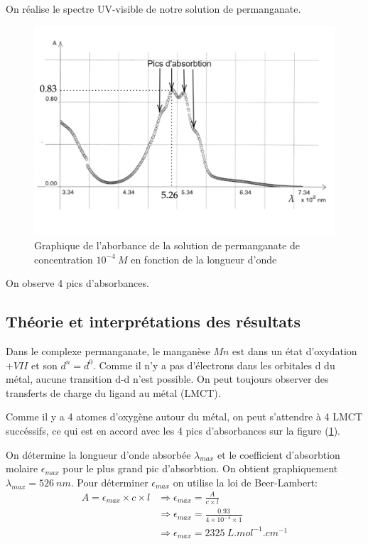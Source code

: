 \documentclass[12pt]{article}
\begin{document}
On réalise le spectre UV-visible de notre solution de permanganate.
\begin{figure}[h!]
    \begin{center}
        \includegraphics[scale=0.7]{Spectre1_Inorga_bis.jpeg}
        \caption{Graphique de l'aborbance de la solution de permanganate de concentration $10^{-4} \ M$ en fonction de la longueur d'onde}
        \label{img1:Spectre_permanganate}
    \end{center}
\end{figure}

On observe 4 pics d'absorbances. 

\subsection{Théorie et interprétations des résultats}

Dans le complexe permanganate, le manganèse $Mn$ est dans un état d'oxydation $+ VII$ et son $d^n=d^0$.
Comme il n'y a pas d'électrons dans les orbitales d du métal, aucune transition d-d n'est possible.
On peut toujours observer des transferts de charge du ligand au métal (LMCT). 

Comme il y a 4 atomes d'oxygène autour du métal, on peut s'attendre à 4 LMCT succéssifs, ce qui est en accord avec les 4 pics d'absorbances sur la figure (\ref{img1:Spectre_permanganate}).

On détermine la longueur d'onde absorbée $\lambda_{max}$ et le coefficient d'absorbtion molaire $\epsilon_{max}$ pour le plus grand pic d'absorbtion.
On obtient graphiquement $\lambda_{max}=526 \ nm$.
Pour déterminer $\epsilon_{max}$ on utilise la loi de Beer-Lambert:
\begin{align*}
    A=\epsilon_{max} \times c \times l &\Longrightarrow \epsilon_{max}=\frac{A}{c \times l} \\
      &\Longrightarrow \epsilon_{max}=\frac{0.93}{4 \times 10^{-4} \times 1} \\
      &\Longrightarrow \epsilon_{max}=2325 \ L.mol^{-1}.cm^{-1}
\end{align*}
\end{document}
